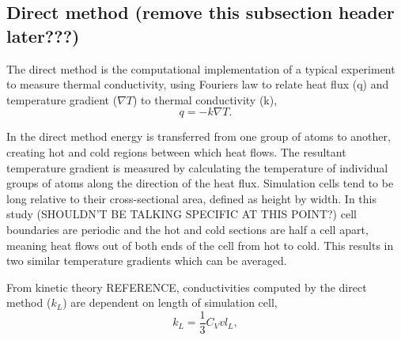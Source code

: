 \documentclass[%
preprint,                                  %
nofootinbib,
 amsmath,amssymb,
 aps,
]{revtex4-1}
\begin{document}
\subsection{\label{sec:intro.direct}Direct method (remove this subsection header later???)}

The direct method is the computational implementation of a typical experiment to measure thermal conductivity, using Fourier\textsc{}s law to relate heat flux (q) and temperature gradient ($\nabla{T}$) to thermal conductivity (k), 
\begin{equation}
q=-k \nabla{T} \label{fourier}.
\end{equation}

In the direct method energy is transferred from one group of atoms to another, creating hot and cold regions between which heat flows. The resultant temperature gradient is measured by calculating the temperature of individual groups of atoms along the direction of the heat flux. Simulation cells tend to be long relative to their cross-sectional area, defined as height by width. %
In this study (SHOULDN'T BE TALKING SPECIFIC AT THIS POINT?) cell boundaries are periodic and the hot and cold sections are half a cell apart, meaning heat flows out of both ends of the cell from hot to cold. This results in two similar temperature gradients which can be averaged.




From kinetic theory REFERENCE, conductivities computed by the direct method ($k_L$) are dependent on length of simulation cell,
\begin{equation}
k_{L} = \frac{1}{3} C_{V} v l_{L} \label{length-dep},
\end{equation}
\end{document}

